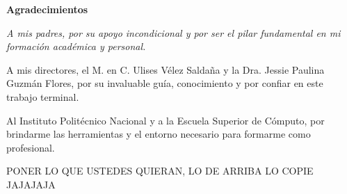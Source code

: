 \thispagestyle{empty}
\begin{center}
    {\Large \textbf{Agradecimientos}}
\end{center}

\vspace{1.5cm}

\begin{flushright}
    \begin{minipage}{0.7\textwidth}
        \itshape
        A mis padres, por su apoyo incondicional y por ser el pilar fundamental en mi formación académica y personal. 
    
        
        A mis directores, el M. en C. Ulises Vélez Saldaña y la Dra. Jessie Paulina Guzmán Flores, por su invaluable guía, conocimiento y por confiar en este trabajo terminal.
        
        Al Instituto Politécnico Nacional y a la Escuela Superior de Cómputo, por brindarme las herramientas y el entorno necesario para formarme como profesional.

        PONER LO QUE USTEDES QUIERAN, LO DE ARRIBA LO COPIE JAJAJAJA
    \end{minipage}
\end{flushright}

\newpage